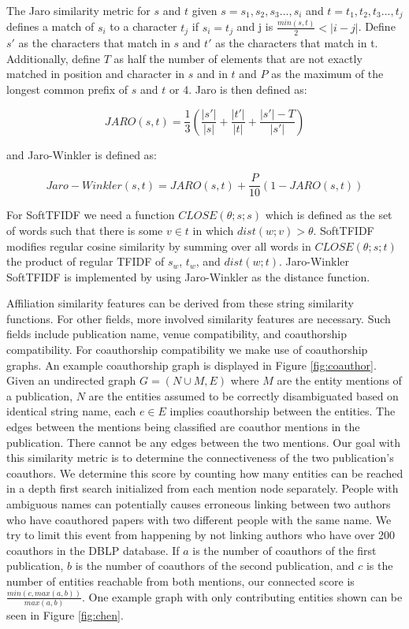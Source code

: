 \documentclass[twocolumn,letterpaper]{article}
\begin{document}
The Jaro similarity metric for $s$ and $t$ given $s= s_1,s_2,s_3...,s_i$ and $t= t_1,t_2,t_3...,t_j$ defines a match of $s_i$ to a character $t_j$ if $s_i=t_j$ and j is $\frac{min(s,t)}{2} < |i-j|$. Define $s'$ as the characters that match in $s$ and $t'$ as the characters that match in t. Additionally, define $T$ as half the number of elements that are not exactly matched in position and character in $s$ and in $t$ and $P$ as the maximum of the longest common prefix of $s$ and $t$ or 4. Jaro is then defined as:
\begin{center}
\[
	JARO(s,t) = \frac{1}{3}\left(\frac{|s'|}{|s|}+\frac{|t'|}{|t|}+\frac{|s'|-T}{|s'|}\right)
\]
\end{center}

and Jaro-Winkler is defined as:
\begin{center}
\[
	Jaro-Winkler(s,t) = JARO(s,t) + \frac{P}{10}(1-JARO(s,t))
\]
\end{center}

For SoftTFIDF we need a function $CLOSE(\theta; s; s)$ which is defined as the set of words such that there is some $v \in t$ in which $dist(w; v) > \theta$. SoftTFIDF modifies regular cosine similarity by summing over all words in $CLOSE(\theta; s; t)$ the product of regular TFIDF of $s_w$, $t_w$, and $dist(w;t)$. Jaro-Winkler SoftTFIDF is implemented by using Jaro-Winkler as the distance function.

Affiliation similarity features can be derived from these string similarity functions. For other fields, more involved similarity features are necessary. Such fields include publication name, venue compatibility, and coauthorship compatibility.  For coauthorship compatibility we make use of coauthorship graphs. An example coauthorship graph is displayed in Figure \ref{fig:coauthor}. Given an undirected graph $G=(N \cup M,E)$ where $M$ are the entity mentions of a publication, $N$ are the entities assumed to be correctly disambiguated based on identical string name, each $e \in E$ implies coauthorship between the entities. The edges between the mentions being classified are coauthor mentions in the publication. There cannot be any edges between the two mentions. Our goal with this similarity metric is to determine the connectiveness of the two publication's coauthors. We determine this score by counting how many entities can be reached in a depth first search initialized from each mention node separately. People with ambiguous names can potentially causes erroneous linking between two authors who have coauthored papers with two different people with the same name. We try to limit this event from happening by not linking authors who have over 200 coauthors in the DBLP database. If $a$ is the number of coauthors of the first publication, $b$ is the number of coauthors of the second publication, and $c$ is the number of entities reachable from both mentions, our connected score is $\frac{min(c,max(a,b))}{max(a,b)}$. One example graph with only contributing entities shown can be seen in Figure \ref{fig:chen}.
\end{document}
